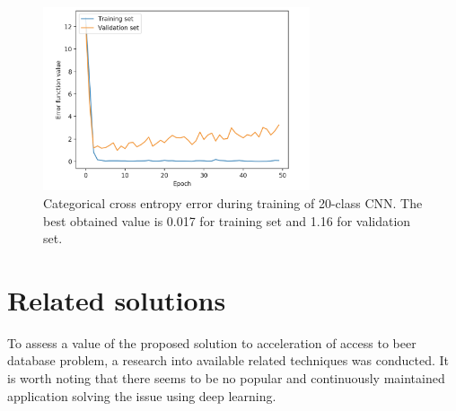 \documentclass[11pt]{article}
\begin{document}
\begin{figure}[h]
\includegraphics[width=0.7\textwidth]{20_class_err}
\centering
\caption{Categorical cross entropy error during training of 20-class CNN. The best obtained value is 0.017 for training set and 1.16 for validation set.}
\label{fig:20_class_err}
\end{figure}
\clearpage

\section{Related solutions} \label{related_solutions}
To assess a value of the proposed solution to acceleration of access to beer database problem, a research into available related techniques was conducted. It is worth noting that there seems to be no popular and continuously maintained application solving the issue using deep learning. 
\end{document}
